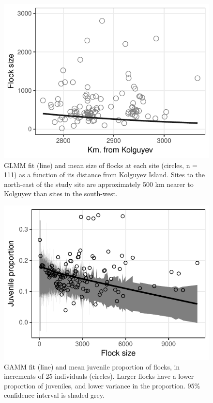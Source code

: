\documentclass[10pt,twocolumn]{paper}
\begin{document}
\begin{figure}[H]
\includegraphics[width = 1\linewidth]{flock_dist.pdf}
\caption{{\small GLMM fit (line) and mean size of flocks at each site (circles, n
= 111) as a function of its distance from Kolguyev Island. Sites to the north-east of the study site are approximately 500 km nearer to Kolguyev than sites in the south-west.}}
\end{figure}

\begin{figure}[H]
\includegraphics[width = 1\linewidth]{jprop_flock.pdf}
\caption{{\small GAMM fit (line) and mean juvenile proportion of flocks, in increments of 25 individuals (circles). Larger flocks have a lower proportion of juveniles, and lower variance in the proportion. 95\% confidence interval is shaded grey.}}
\end{figure}
\end{document}
